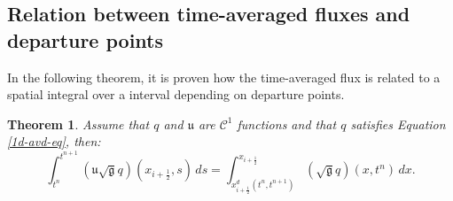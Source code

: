 \documentclass[preprint,12pt]{elsarticle}
\begin{document}
\begin{linenumbers}

\section{Relation between time-averaged fluxes and departure points}
\label{app-flux}
In the following theorem, it is proven how the time-averaged flux is related to a spatial integral over a interval depending on departure points.
\newtheorem{theorem}{Theorem}
\begin{theorem}
\label{flux-theorem}
Assume that $q$ and $\mathfrak{u}$ are $\mathcal{C}^1$ functions and that 
$q$ satisfies Equation \eqref{1d-avd-eq}, then:
\begin{equation}
	\label{chp2-sec-flux:approx1}
	\int_{t^n}^{t^{n+1}} (\mathfrak{u}\sqrt{\mathfrak{g}}q)(x_{i+\frac{1}{2}},s) \,ds = 
	\int^{x_{i+\frac{1}{2}}}_{ x_{i+\frac{1}{2}}^d(t^n,t^{n+1})} (\sqrt{\mathfrak{g}}q)(x,t^n)\,dx.
\end{equation}
\end{theorem}



\end{linenumbers}
\end{document}

